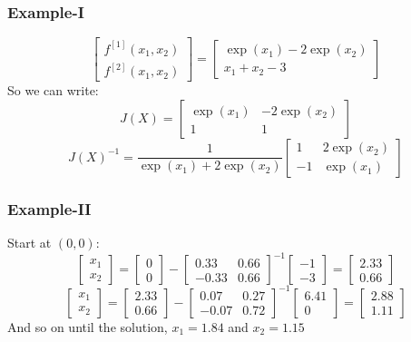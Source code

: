 \documentclass{beamer}
\begin{document}
\begin{frame}
\frametitle[alignment=center]{Example-I}
$$\left[\begin{array}{c}f^{[1]}(x_1,x_2) \\ f^{[2]}(x_1,x_2)\end{array}\right]=\left[\begin{array}{c}\exp(x_1)-2\exp(x_2) \\ x_1+x_2-3\end{array}\right]$$
So we can write:
$$J(X)=\left[\begin{array}{cc}\exp(x_1) & -2\exp(x_2) \\ 1 & 1\end{array}\right]$$
$$J(X)^{-1}=\frac{1}{\exp(x_1)+2\exp(x_2)}\left[\begin{array}{cc}1 & 2\exp(x_2) \\ -1 & \exp(x_1)\end{array}\right]$$
\end{frame}

\begin{frame}
\frametitle[alignment=center]{Example-II}
Start at $(0,0)$:
$$\left[\begin{array}{c}x_1 \\ x_2\end{array}\right]=\left[\begin{array}{c}0 \\ 0\end{array}\right]-\left[\begin{array}{cc}0.33 & 0.66 \\ -0.33 &  0.66\end{array}\right]^{-1}\left[\begin{array}{c}-1 \\ -3\end{array}\right]=\left[\begin{array}{c}2.33 \\ 0.66\end{array}\right]$$
$$\left[\begin{array}{c}x_1 \\ x_2\end{array}\right]=\left[\begin{array}{c}2.33 \\ 0.66\end{array}\right]-\left[\begin{array}{cc}0.07 & 0.27 \\ -0.07 &  0.72\end{array}\right]^{-1}\left[\begin{array}{c}6.41 \\ 0\end{array}\right]=\left[\begin{array}{c}2.88 \\ 1.11\end{array}\right]$$
And so on until the solution, $x_1=1.84$ and $x_2=1.15$
\end{frame}
\end{document}
